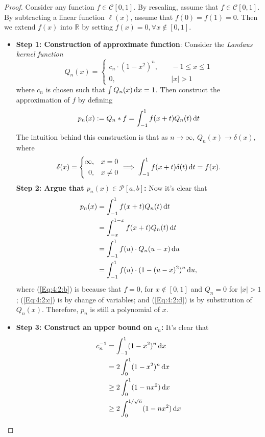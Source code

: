 \begin{proof}
Consider any function $f\in\mathcal{C}[0,1]$.
By rescaling, assume that $f\in\mathcal{C}[0,1]$.
By subtracting a linear function $\ell(x)$, 
assume that $f(0) = f(1) = 0$. 
Then we extend $f(x)$ into $\mathbb{R}$ by setting $f(x)=0,\forall x\notin [0,1]$.

\begin{itemize}
\item
\textbf{Step 1: Construction of approximate function}: Consider the \emph{Landaus kernel function}
\[
Q_n(x)
=
\left\{
\begin{aligned}
c_n\cdot(1-x^2)^n,&\quad -1\le x\le 1\\
0,&\quad |x|>1
\end{aligned}
\right.
\]
where $c_n$ is chosen such that $\int Q_n(x)\,\mathrm{d} x = 1$. Then construct the approximation of $f$ by defining
\[
p_n(x):=Q_n * f = \int_{-1}^1f(x+t)Q_n(t)\,\mathrm{d} t
\]
The intuition behind this construction is that as $n\to\infty$, $Q_n(x)\to\delta(x)$, where
\[
\delta(x)=\left\{
\begin{aligned}
\infty,&\quad x=0\\
0,&\quad x\ne0
\end{aligned}
\right.
\implies
\int_{-1}^1f(x+t)\delta(t)\,\mathrm{d} t = f(x).
\]
\textbf{Step 2: Argue that $p_n(x)\in \mathcal{P}[a,b]$: }Now it's clear that
\begin{subequations}
\begin{align}
p_n(x)&=\int_{-1}^1f(x+t)Q_n(t)\diff t\label{Eq:4:2:a}\\
&=\int^{1-x}_{-x} f(x+t)Q_n(t)\diff t \label{Eq:4:2:b}\\
&=\int_{-1}^1f(u)\cdot Q_n(u-x)\diff u\label{Eq:4:2:c}\\
&=\int_{-1}^1f(u)\cdot (1 - (u - x)^2)^n\diff u,\label{Eq:4:2:d}
\end{align}
\end{subequations}
where (\ref{Eq:4:2:b}) is because that $f=0$, for $x\notin[0,1]$ and $Q_n=0$ for $|x|>1$;
(\ref{Eq:4:2:c}) is by change of variables; and (\ref{Eq:4:2:d}) is by substitution of $Q_n(x)$. Therefore, $p_n$ is still a polynomial of $x$.
\item
\textbf{Step 3: Construct an upper bound on $c_n$: }It's clear that
\begin{align*}
c_n^{-1}&=\int_{-1}^1(1-x^2)^n\diff x\\
&=2\int_{0}^1(1-x^2)^n\diff x\\
&\ge2\int_0^1(1-nx^2)\diff x\\
&\ge2\int_{0}^{1/\sqrt{n}}(1-nx^2)\diff x\\

\end{align*}
\end{itemize}
\end{proof}
